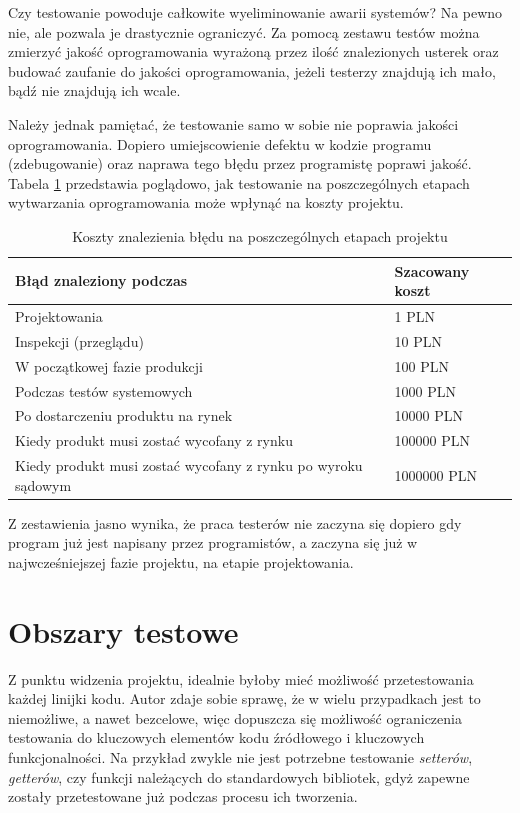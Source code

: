 Czy testowanie powoduje całkowite wyeliminowanie awarii systemów? Na pewno nie, ale pozwala je drastycznie ograniczyć. Za pomocą zestawu testów można zmierzyć jakość oprogramowania wyrażoną przez ilość znalezionych usterek oraz budować zaufanie do jakości oprogramowania, jeżeli testerzy znajdują ich mało, bądź nie znajdują ich wcale.

Należy jednak pamiętać, że testowanie samo w sobie nie poprawia jakości oprogramowania. Dopiero umiejscowienie defektu w kodzie programu (zdebugowanie) oraz naprawa tego błędu przez programistę poprawi jakość. Tabela \ref{tab:koszty_bledu} przedstawia poglądowo, jak testowanie na poszczególnych etapach wytwarzania oprogramowania może wpłynąć na koszty projektu.

\begin{table}[]
\centering
\caption{Koszty znalezienia błędu na poszczególnych etapach projektu}
\label{tab:koszty_bledu}
\begin{tabular}{|l|l|}
\hline
\textbf{Błąd znaleziony podczas} & \textbf{Szacowany koszt} \\ \hline
Projektowania & 1 PLN	\\ \hline
Inspekcji (przeglądu) & 10 PLN	\\ \hline
W początkowej fazie produkcji & 100 PLN	\\ \hline
Podczas testów systemowych & 1000 PLN	\\ \hline
Po dostarczeniu produktu na rynek & 10000 PLN	\\ \hline
Kiedy produkt musi zostać wycofany z rynku & 100000 PLN	\\ \hline
Kiedy produkt musi zostać wycofany z rynku po wyroku sądowym & 1000000 PLN	\\ \hline
\end{tabular}
\end{table}

Z zestawienia jasno wynika, że praca testerów nie zaczyna się dopiero gdy program już jest napisany przez programistów, a zaczyna się już w najwcześniejszej fazie projektu, na etapie projektowania.

\section{Obszary testowe}
Z punktu widzenia projektu, idealnie byłoby mieć możliwość przetestowania każdej linijki kodu. Autor zdaje sobie sprawę, że w wielu przypadkach jest to niemożliwe, a nawet bezcelowe, więc dopuszcza się możliwość ograniczenia testowania do kluczowych elementów kodu źródłowego i kluczowych funkcjonalności. Na przykład zwykle nie jest potrzebne testowanie \textit{setterów}, \textit{getterów}, czy funkcji należących do standardowych bibliotek, gdyż zapewne zostały przetestowane już podczas procesu ich tworzenia. 

